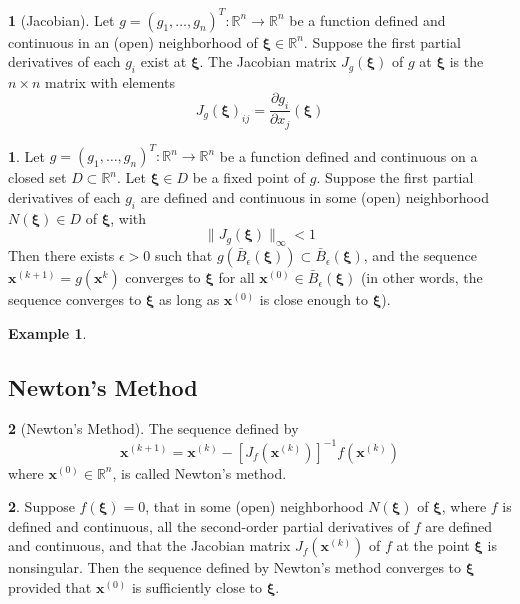\documentclass[12pt]{article}
\theoremstyle{definition}
\newtheorem{definition}{\color{NavyBlue}{\textbf{Definition}}}
\newcommand{\e}{\epsilon}
\newcommand{\R}{\mathbb{R}}
\newcommand{\norm}[1]{\lVert#1\rVert}
\newcommand{\x}{\bm{x}}
\newcommand{\xib}{\bm{\xi}}
\newtheorem{theorem}{\color{ForestGreen}{\textbf{Theorem}}}
\newtheorem{example}{\color{WildStrawberry}Example}
\theoremstyle{definition}
\begin{document}
\begin{definition}[Jacobian]
Let $g = (g_1, \ldots, g_n)^T : \R^n \to \R^n$ be a function defined and continuous in an (open) neighborhood of $\xib \in \R^n$. Suppose the first partial derivatives of each $g_i$ exist at $\xib$. The Jacobian matrix $J_g(\xib)$ of $g$ at $\xib$ is the $n \times n$ matrix with elements
\begin{equation}
	J_g(\xib)_{ij} = \frac{\partial g_i}{\partial x_j} (\xib) 
\end{equation}
\end{definition}

\begin{theorem}
Let $g = (g_1, \ldots, g_n)^T : \R^n \to \R^n$ be a function defined and continuous on a closed set $D \subset \R^n$. Let $\xib \in D$ be a fixed point of $g$. Suppose the first partial derivatives of each $g_i$ are defined and continuous in some (open) neighborhood $N(\xib) \in D$ of $\xib$, with 
\begin{equation}
	\norm{J_g(\xib)}_\infty < 1  	
\end{equation}
Then there exists $\e > 0$ such that $g (\bar B_\e(\xib)) \subset \bar B_\e(\xib)$, and the sequence $\x^{(k+1)} = g(\x^{k})$ converges to $\xib$ for all $\x^{(0)} \in \bar B_\e(\xib)$ (in other words, the sequence converges to $\xib$ as long as $\x^{(0)}$ is close enough to $\xib$).
\end{theorem}

\begin{example}

\end{example}

\subsection*{Newton's Method}
\begin{definition}[Newton's Method]
	The sequence defined by
	\begin{equation}
		\x^{(k+1)} = \x^{(k)} - [J_f(\x^{(k)})]^{-1} f(\x^{(k)})
	\end{equation}
	where $\x^{(0)} \in \R^n$, is called Newton's method. 
\end{definition}

\begin{theorem}
Suppose $f(\xib) = 0$, that in some (open) neighborhood $N(\xib)$ of $\xib$, where $f$ is defined and continuous, all the second-order partial derivatives of $f$ are defined and continuous, and that the Jacobian matrix $J_f(\x^{(k)})$ of $f$ at the point $\xib$ is nonsingular. Then the sequence defined by Newton's method converges to $\xib$ provided that $\x^{(0)}$ is sufficiently close to $\xib$. 
\end{theorem}
\end{document}
